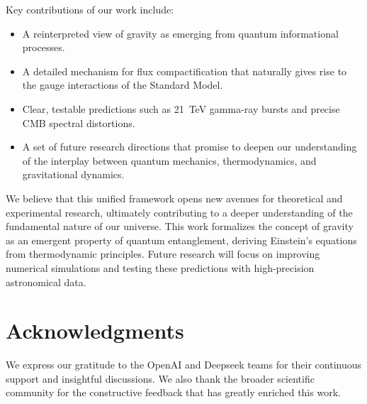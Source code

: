 \documentclass[12pt, a4paper]{article}
\begin{document}
Key contributions of our work include:
\begin{itemize}
    \item A reinterpreted view of gravity as emerging from quantum informational processes.
    \item A detailed mechanism for flux compactification that naturally gives rise to the gauge interactions of the Standard Model.
    \item Clear, testable predictions such as 21~TeV gamma-ray bursts and precise CMB spectral distortions.
    \item A set of future research directions that promise to deepen our understanding of the interplay between quantum mechanics, thermodynamics, and gravitational dynamics.
\end{itemize}

We believe that this unified framework opens new avenues for theoretical and experimental research, ultimately contributing to a deeper understanding of the fundamental nature of our universe.
This work formalizes the concept of gravity as an emergent property of quantum entanglement, deriving Einstein’s equations from thermodynamic principles. Future research will focus on improving numerical simulations and testing these predictions with high-precision astronomical data.


\section*{Acknowledgments}
We express our gratitude to the OpenAI and Deepseek teams for their continuous support and insightful discussions. We also thank the broader scientific community for the constructive feedback that has greatly enriched this work.



\end{document}
